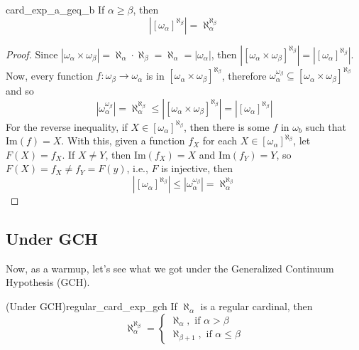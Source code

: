 \begin{lemma}{}{card_exp_a_geq_b}
    If $\alpha\geq\beta$, then
    $$\left|[\omega_\alpha]^{\aleph_\beta}\right|=\aleph_\alpha^{\aleph_\beta}$$
\end{lemma}

\begin{proof}
    Since $|\omega_\alpha\times\omega_\beta|=\aleph_\alpha\cdot\aleph_\beta=\aleph_\alpha=|\omega_\alpha|$, then $\left|[\omega_\alpha\times\omega_\beta]^{\aleph_\beta}\right|=\left|[\omega_\alpha]^{\aleph_\beta}\right|$. Now, every function $f:\omega_\beta\to\omega_\alpha$ is in $[\omega_\alpha\times\omega_\beta]^{\aleph_\beta}$, therefore $\omega_\alpha^{\omega_\beta}\subseteq[\omega_\alpha\times\omega_\beta]^{\aleph_\beta}$ and so
    $$\left|\omega_\alpha^{\omega_\beta}\right|=\aleph_\alpha^{\aleph_\beta}\leq\left|[\omega_\alpha\times\omega_\beta]^{\aleph_\beta}\right|=\left|[\omega_\alpha]^{\aleph_\beta}\right|$$
    For the reverse inequality, if $X\in[\omega_\alpha]^{\aleph_\beta}$, then there is some $f$ in $\omega_b$ such that $\mathrm{Im}(f)=X$. With this, given a function $f_X$ for each $X\in[\omega_\alpha]^{\aleph_\beta}$, let $F(X)=f_X$. If $X\neq Y$, then $\mathrm{Im}(f_X)=X$ and $\mathrm{Im}(f_Y)=Y$, so $F(X)=f_X\neq f_Y=F(y)$, i.e., $F$ is injective, then
    $$\left|[\omega_\alpha]^{\aleph_\beta}\right|\leq\left|\omega_\alpha^{\omega_\beta}\right|=\aleph_\alpha^{\aleph_\beta}$$
\end{proof}

\subsection{Under GCH}

Now, as a warmup, let's see what we got under the Generalized Continuum Hypothesis (GCH).

\begin{lemma}{(Under GCH)}{regular_card_exp_gch}
    If $\aleph_\alpha$ is a regular cardinal, then
    $$\aleph_\alpha^{\aleph_\beta}=
    \begin{cases}
        \aleph_\alpha,\text{ if }\alpha>\beta\\
        \aleph_{\beta+1},\text{ if }\alpha\leq\beta
    \end{cases}
    $$
\end{lemma}

